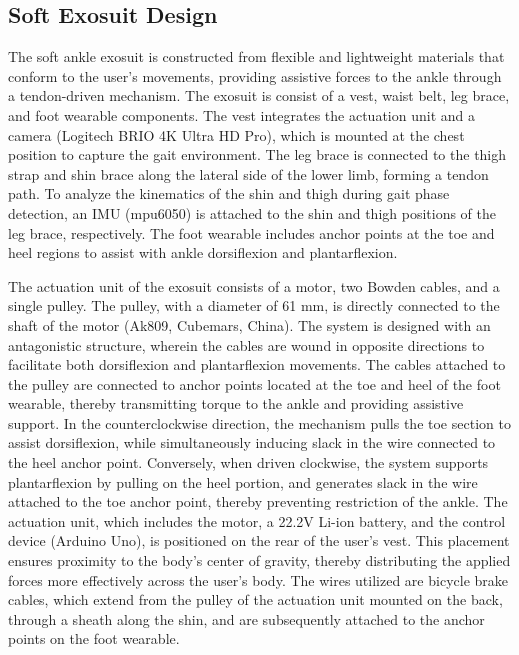\documentclass[journal,article,submit,pdftex,moreauthors]{Definitions/mdpi}
\begin{document}
\subsection{Soft Exosuit Design}
The soft ankle exosuit is constructed from flexible and lightweight materials that conform to the user's movements, providing assistive forces to the ankle through a tendon-driven mechanism. 
The exosuit is consist of a vest, waist belt, leg brace, and foot wearable components. The vest integrates the actuation unit and a camera (Logitech BRIO 4K Ultra HD Pro), which is mounted at the chest position to capture the gait environment.
The leg brace is connected to the thigh strap and shin brace along the lateral side of the lower limb, forming a tendon path. To analyze the kinematics of the shin and thigh during gait phase detection, an IMU (mpu6050) is attached to the shin and thigh positions of the leg brace, respectively. The foot wearable includes anchor points at the toe and heel regions to assist with ankle dorsiflexion and plantarflexion.

The actuation unit of the exosuit consists of a motor, two Bowden cables, and a single pulley. The pulley, with a diameter of 61 mm, is directly connected to the shaft of the motor (Ak809, Cubemars, China). The system is designed with an antagonistic structure, wherein the cables are wound in opposite directions to facilitate both dorsiflexion and plantarflexion movements. The cables attached to the pulley are connected to anchor points located at the toe and heel of the foot wearable, thereby transmitting torque to the ankle and providing assistive support. In the counterclockwise direction, the mechanism pulls the toe section to assist dorsiflexion, while simultaneously inducing slack in the wire connected to the heel anchor point. Conversely, when driven clockwise, the system supports plantarflexion by pulling on the heel portion, and generates slack in the wire attached to the toe anchor point, thereby preventing restriction of the ankle. The actuation unit, which includes the motor, a 22.2V Li-ion battery, and the control device (Arduino Uno), is positioned on the rear of the user's vest. This placement ensures proximity to the body's center of gravity, thereby distributing the applied forces more effectively across the user's body. The wires utilized are bicycle brake cables, which extend from the pulley of the actuation unit mounted on the back, through a sheath along the shin, and are subsequently attached to the anchor points on the foot wearable.
\end{document}
